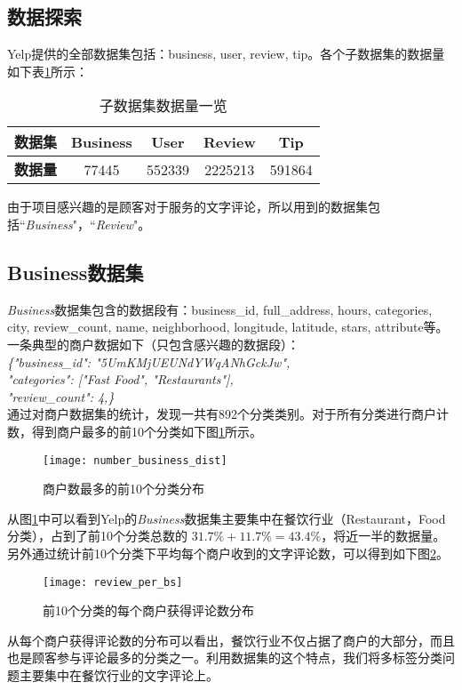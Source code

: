 \documentclass[a4paper, twocolumn]{article}
\begin{document}
\begin{CJK}{UTF8}{gbsn}
	\section{数据探索}
	Yelp提供的全部数据集包括：business, user, review, tip。各个子数据集的数据量如下表\ref*{tb:weight}所示：
	\begin{small}
	\begin{table}[h]
		\caption{子数据集数据量一览}
		\label{tb:weight}
		\centering
		\begin{tabular}{| l | c| c| c| c|}
			\hline
			\textbf{数据集} & Business & User & Review & Tip \\ 
			\hline
			\textbf{数据量} & 77445 & 552339 & 2225213 & 591864\\ 
			\hline
		\end{tabular}
	\end{table} 
	\end{small}
	\newline
	由于项目感兴趣的是顾客对于服务的文字评论，所以用到的数据集包括“\textit{Business}"，“\textit{Review}"。
	\subsection{Business数据集}
	\textit{Business}数据集包含的数据段有：business\_id, full\_address, hours, categories, city, review\_count, name, neighborhood, longitude, latitude, stars, attribute等。\\
	一条典型的商户数据如下（只包含感兴趣的数据段）：\\
	\textit{\{"business\_id": "5UmKMjUEUNdYWqANhGckJw", \\
		"categories": ["Fast Food", "Restaurants"],\\
		"review\_count": 4,\}} \\
	通过对商户数据集的统计，发现一共有892个分类类别。对于所有分类进行商户计数，得到商户最多的前10个分类如下图\ref{fig:number_business_dist}所示。	
	\begin{figure}[h]
	\centering
	\texttt{[image: number\_business\_dist]}
	\caption{商户数最多的前10个分类分布}
	\label{fig:number_business_dist}
	\end{figure}
	\newline
	从图\ref{fig:number_business_dist}中可以看到Yelp的\textit{Business}数据集主要集中在餐饮行业（Restaurant，Food分类），占到了前10个分类总数的 $ 31.7\% + 11.7\% =  43.4\%$，将近一半的数据量。\\
	另外通过统计前10个分类下平均每个商户收到的文字评论数，可以得到如下图\ref{fig:review_per_bs}。
	\begin{figure}[h]
	\centering
	\texttt{[image: review\_per\_bs]}
	\caption{前10个分类的每个商户获得评论数分布}
	\label{fig:review_per_bs}
	\end{figure}
	\newline
	从每个商户获得评论数的分布可以看出，餐饮行业不仅占据了商户的大部分，而且也是顾客参与评论最多的分类之一。利用数据集的这个特点，我们将多标签分类问题主要集中在餐饮行业的文字评论上。

\end{CJK}
\end{document}

